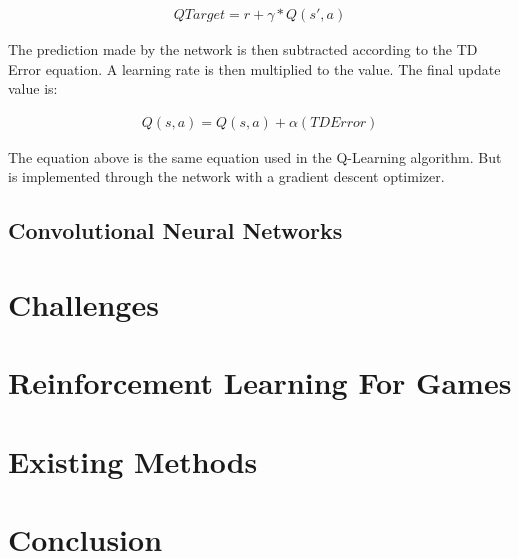 \begin{align}
    QTarget = r + \gamma*Q(s',a)
\end{align}

The prediction made by the network is then
subtracted according to the TD Error equation. A learning rate is then
multiplied to the value. The final update value is:

\begin{align}
    Q(s,a) = Q(s,a) + \alpha (TDError)
\end{align}

The equation above is the same equation used in the Q-Learning algorithm. But
is implemented through the network with a gradient descent optimizer.

\subsection{Convolutional Neural Networks}

\section{Challenges}

\section{Reinforcement Learning For Games}

\section{Existing Methods}

\section{Conclusion}
